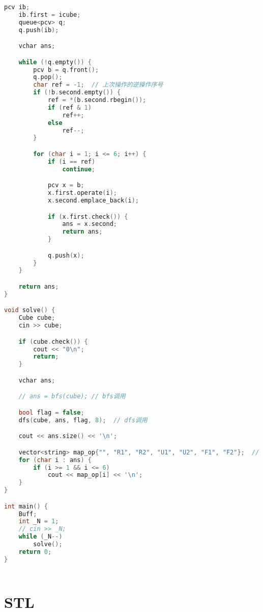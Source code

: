 \begin{lstlisting}[language=C++]
    pcv ib;
    ib.first = icube;
    queue<pcv> q;
    q.push(ib);

    vchar ans;

    while (!q.empty()) {
        pcv b = q.front();
        q.pop();
        char ref = -1;  // 上次操作的逆操作序号
        if (!b.second.empty()) {
            ref = *(b.second.rbegin());
            if (ref & 1)
                ref++;
            else
                ref--;
        }

        for (char i = 1; i <= 6; i++) {
            if (i == ref)
                continue;

            pcv x = b;
            x.first.operate(i);
            x.second.emplace_back(i);

            if (x.first.check()) {
                ans = x.second;
                return ans;
            }

            q.push(x);
        }
    }

    return ans;
}

void solve() {
    Cube cube;
    cin >> cube;

    if (cube.check()) {
        cout << "0\n";
        return;
    }

    vchar ans;

    // ans = bfs(cube); // bfs调用

    bool flag = false;
    dfs(cube, ans, flag, 8);  // dfs调用

    cout << ans.size() << '\n';

    vector<string> map_op{"", "R1", "R2", "U1", "U2", "F1", "F2"};  // 操作映射
    for (char i : ans) {
        if (i >= 1 && i <= 6)
            cout << map_op[i] << '\n';
    }
}

int main() {
    Buff;
    int _N = 1;
    // cin >> _N;
    while (_N--)
        solve();
    return 0;
}



\end{lstlisting}
\section{STL}

